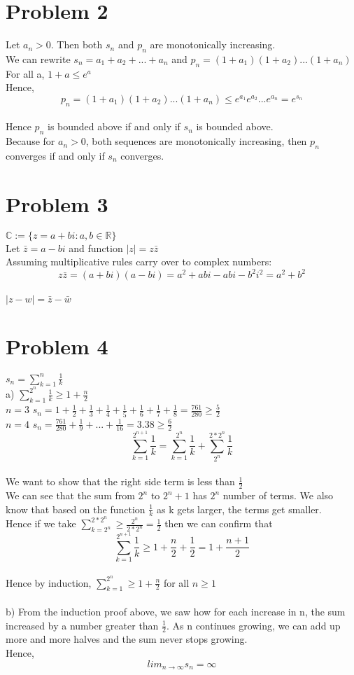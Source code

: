 \documentclass{article}
\begin{document}
\section*{Problem 2}
Let $a_n > 0$. Then both $s_n$ and $p_n$ are monotonically increasing.
\\We can rewrite $s_n = a_1 + a_2 + ... + a_n$ and $p_n = (1+a_1)(1+a_2)...(1+a_n)$
\\For all a, $1 + a \leq e^a$
\\Hence, $$p_n = (1 + a_1)(1 + a_2)...(1 + a_n) \leq e^{a_1}e^{a_2}...e^{a_n} = e^{s_n}$$
\\Hence $p_n$ is bounded above if and only if $s_n$ is bounded above.
\\Because for $a_n > 0$, both sequences are monotonically increasing, then $p_n$ converges if and only if $s_n$ converges.

\section*{Problem 3}
$\mathbb{C} := \{z = a+bi : a,b \in \mathbb{R}\}$
\\Let $\bar{z} = a - bi$ and function $|z| = z\bar{z}$
\\Assuming multiplicative rules carry over to complex numbers: $$z\bar{z} = (a+bi)(a-bi) =a^2 +abi - abi -b^2i^2 = a^2 + b^2$$
\\$|z - w| = \bar{z} - \bar{w}$

\section*{Problem 4}
$s_n = \sum_{k=1}^{n} \frac{1}{k}$
\\a) $\sum_{k=1}^{2^n} \frac{1}{k} \geq 1 + \frac{n}{2}$
\\$n = 3$ $s_n = 1 + \frac{1}{2} + \frac{1}{3} + \frac{1}{4} + \frac{1}{5} + \frac{1}{6} + \frac{1}{7} + \frac{1}{8} = \frac{761}{280} \geq \frac{5}{2}$
\\$n = 4$ $s_n = \frac{761}{280} + \frac{1}{9} + ... + \frac{1}{16} = 3.38 \geq \frac{6}{2}$
$$\sum_{k=1}^{2^{n+1}} \frac{1}{k} = \sum_{k=1}^{2^{n}} \frac{1}{k} + \sum_{2^n}^{2*2^{n}} \frac{1}{k}$$
\\We want to show that the right side term is less than $\frac{1}{2}$
\\We can see that the sum from $2^n$ to $2^n+1$ has $2^n$ number of terms. We also know that based on the function $\frac{1}{k}$ as k gets larger, the terms get smaller.
\\Hence if we take $\sum_{k=2^n}^{2*2^n} \geq \frac{2^n}{2*2^n} = \frac{1}{2}$ then we can confirm that $$\sum_{k=1}^{2^{n+1}} \frac{1}{k} \geq 1 + \frac{n}{2} + \frac{1}{2} = 1 + \frac{n+1}{2}$$
\\Hence by induction, $\sum_{k=1}^{2^n} \geq 1 + \frac{n}{2}$ for all $n \geq 1$
\\
\\b) From the induction proof above, we saw how for each increase in n, the sum increased by a number greater than $\frac{1}{2}$. As n continues growing, we can add up more and more halves and the sum never stops growing. 
\\Hence, $$lim_{n \to \infty} s_n = \infty$$
\end{document}
